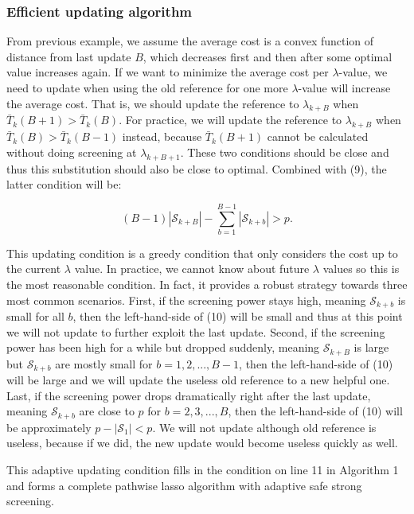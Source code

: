 \documentclass{article}
\begin{document}
\subsubsection{Efficient updating algorithm}

From previous example, we assume the average cost is a convex function of distance from last update $B$, which decreases first and then after some optimal value increases again. If we want to minimize the average cost per $\lambda$-value, we need to update when using the old reference for one more $\lambda$-value will increase the average cost. That is, we should update the reference to $\lambda_{k+B}$ when $\bar{T}_k(B+1)>\bar{T}_k(B)$. For practice, we will update the reference to $\lambda_{k+B}$ when $\bar{T}_k(B)>\bar{T}_k(B-1)$ instead, because $\bar{T}_k(B+1)$ cannot be calculated without doing screening at $\lambda_{k+B+1}$. These two conditions should be close and thus this substitution should also be close to optimal. Combined with (9), the latter condition will be:

\begin{equation}
    (B-1)|\mathcal{S}_{k+B}|-\sum_{b=1}^{B-1}|\mathcal{S}_{k+b}|>p.
\end{equation}


This updating condition is a greedy condition that only considers the cost up to the current $\lambda$ value. In practice, we cannot know about future $\lambda$ values so this is the most reasonable condition. In fact, it provides a robust strategy towards three most common scenarios. First, if the screening power stays high, meaning $\mathcal{S}_{k+b}$ is small for all $b$, then the left-hand-side of (10) will be small and thus at this point we will not update to further exploit the last update. Second, if the screening power has been high for a while but dropped suddenly, meaning $\mathcal{S}_{k+B}$ is large but $\mathcal{S}_{k+b}$ are mostly small for $b=1,2,...,B-1$, then the left-hand-side of (10) will be large and we will update the useless old reference to a new helpful one. Last, if the screening power drops dramatically right after the last update, meaning $\mathcal{S}_{k+b}$ are close to $p$ for $b=2,3,...,B$, then the left-hand-side of (10) will be approximately $p-|\mathcal{S}_1|<p$. We will not update although old reference is useless, because if we did, the new update would become useless quickly as well.

This adaptive updating condition fills in the condition on line 11 in Algorithm 1 and forms a complete pathwise lasso algorithm with adaptive safe strong screening. 
\end{document}
